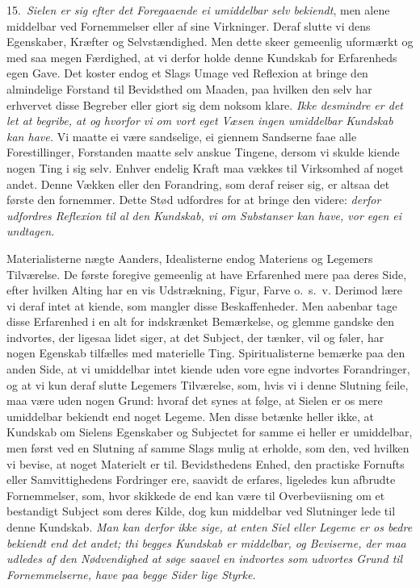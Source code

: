 \documentclass[12pt,a4paper]{article}
\newcommand{\opage}[1]{\marginnote{\footnotesize\textit{[#1]}}}
\begin{document}
15.~\emph{Sielen er sig efter det Foregaaende ei umiddelbar selv bekiendt}, men
alene middelbar ved Fornemmelser eller af sine Virkninger. Deraf slutte vi dens
Egenskaber, Kræfter og Selvstændighed. Men dette skeer gemeenlig uformærkt og med
saa megen Færdighed, at vi derfor holde denne Kundskab for Erfarenheds egen Gave.
Det koster endog et Slags Umage ved Reflexion at bringe den almindelige Forstand
til Bevidsthed om Maaden, paa hvilken den selv har erhvervet disse Begreber eller
giort sig dem noksom klare. \emph{Ikke desmindre er det let at begribe, at og
hvorfor
\opage{28} vi om vort eget Væsen ingen umiddelbar Kundskab kan have.} Vi maatte ei være
sandselige, ei giennem Sandserne faae alle Forestillinger, Forstanden maatte selv
anskue Tingene, dersom vi skulde kiende nogen Ting i sig selv. Enhver endelig
Kraft maa vækkes til Virksomhed af noget andet. Denne Vækken eller den Forandring,
som deraf reiser sig, er altsaa det første den fornemmer. Dette Stød udfordres for
at bringe den videre: \emph{derfor udfordres Reflexion til al den Kundskab, vi om
Substanser kan have, vor egen ei undtagen.}

Materialisterne nægte Aanders, Idealisterne endog Materiens og Legemers
Tilværelse. De første foregive gemeenlig at have Erfarenhed mere paa deres Side,
efter hvilken Alting har en vis Udstrækning, Figur, Farve o.~s.~v. Derimod lære vi
deraf intet at kiende, som mangler disse Beskaffenheder. Men aabenbar tage disse
Erfarenhed i en alt for indskrænket Bemærkelse, og glemme gandske den indvortes,
der ligesaa lidet siger, at det Subject, der tænker, vil og føler, har nogen
Egenskab tilfælles med materielle Ting. Spiritualisterne bemærke paa den anden
Side, at vi umiddelbar intet kiende uden vore egne indvortes Forandringer, og at
vi kun deraf slutte Legemers Tilværelse, som, hvis vi i denne Slutning feile, maa
være uden nogen Grund: hvoraf det synes at følge, at Sielen er os mere umiddelbar
bekiendt end noget Legeme. Men disse betænke
\opage{29} heller ikke, at Kundskab om Sielens Egenskaber og Subjectet for samme ei heller er
umiddelbar, men først ved en Slutning af samme Slags mulig at erholde, som den, ved
hvilken vi bevise, at noget Materielt er til. Bevidsthedens Enhed, den practiske
Fornufts eller Samvittighedens Fordringer ere, saavidt de erfares, ligeledes kun
afbrudte Fornemmelser, som, hvor skikkede de end kan være til Overbeviisning om et
bestandigt Subject som deres Kilde, dog kun middelbar ved Slutninger lede til denne
Kundskab. \emph{Man kan derfor ikke sige, at enten Siel eller Legeme er os bedre
bekiendt end det andet; thi begges Kundskab er middelbar, og Beviserne, der maa
udledes af den Nødvendighed at søge saavel en indvortes som udvortes Grund til
Fornemmelserne, have paa begge Sider lige Styrke.}
\end{document}
